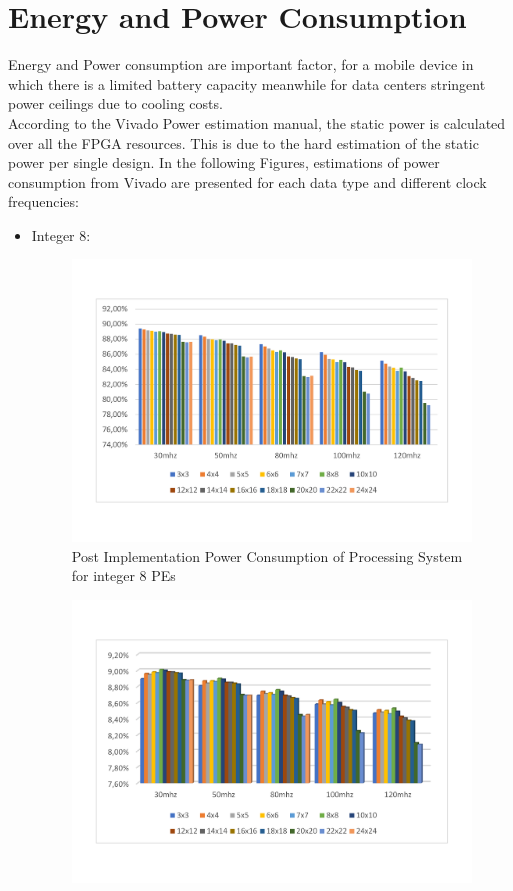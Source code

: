 \section{Energy and Power Consumption}
Energy and Power consumption are important factor, for a mobile device in which there is a limited battery capacity meanwhile for data centers stringent power ceilings due to cooling costs.\\ 
According to the Vivado Power estimation manual\cite{paper:49}, the static power is calculated over all the FPGA resources. This is due to the hard estimation of the static power per single design.
In the following Figures, estimations of power consumption from Vivado are presented for each data type and different clock frequencies:
\begin{itemize}
\item Integer 8:
\begin{figure}[!htbp]
\centering
\captionsetup{justification=centering}
\includegraphics[scale=0.45,angle=0]{./figure/graphs/power_ps_int8_freq.pdf}
\caption{Post Implementation Power Consumption of Processing System for integer 8 PEs}
\label{fig:powint8}
\end{figure}
\begin{figure}[!htbp]
\centering
\captionsetup{justification=centering}
\includegraphics[scale=0.45,angle=0]{./figure/graphs/power_plstatic_int8_freq.pdf}

\end{figure}
\end{itemize}
